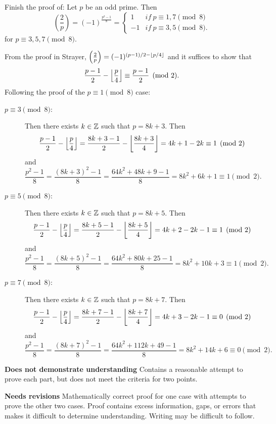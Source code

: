 \documentclass[letterpaper, 11pt]{ximera}
\begin{document}
\begin{ex}
 	Finish the proof of:  Let $p$ be an odd prime. Then 
	\begin{equation*}
 		\left(\frac{2}{p}\right)=(-1)^{\frac{p^2-1}{8}}=
		\begin{cases}
			 1& if\ p\equiv 1,7 \pmod 8\\
			 -1 & if\ p\equiv 3,5 \pmod 8.
		\end{cases}
	\end{equation*} 
	for $p\equiv 3,5,7 \pmod 8$.

	\begin{solution}
		From the proof in Strayer, $\left(\frac{2}{p}\right)=(-1)^{(p-1)/2-\left\lfloor p/4\right\rfloor}$ and it suffices to show that 
			\[\frac{p-1}{2}-\left\lfloor \frac{p}{4}\right\rfloor\equiv \frac{p-1}{2}\pmod{2}.\]
		Following the proof of the $p\equiv 1\pmod{8}$ case:

		\begin{description}
			\item[$p\equiv3\pmod 8$:] Then there exists $k\in\mathbb Z$ such that $p=8k+3.$ Then 
			\[\frac{p-1}{2}-\left\lfloor \frac{p}{4}\right\rfloor
			=\frac{8k+3-1}{2}-\left\lfloor \frac{8k+3}{4}\right\rfloor
			=4k+1-2k\equiv 1\pmod{2}\]
			and 
			\[\frac{p^2-1}{8}
			=\frac{(8k+3)^2-1}{8}
			=\frac{64k^2+48k+9-1}{8}
			=8k^2+6k+1\equiv 1\pmod{2}.\]
			\item[$p\equiv5\pmod 8$:] Then there exists $k\in\mathbb Z$ such that $p=8k+5.$ Then 
			\[\frac{p-1}{2}-\left\lfloor \frac{p}{4}\right\rfloor
			=\frac{8k+5-1}{2}-\left\lfloor \frac{8k+5}{4}\right\rfloor
			=4k+2-2k-1\equiv 1\pmod{2}\]
			and 
			\[\frac{p^2-1}{8}
			=\frac{(8k+5)^2-1}{8}
			=\frac{64k^2+80k+25-1}{8}
			=8k^2+10k+3\equiv 1\pmod{2}.\]
			\item[$p\equiv7\pmod 8$:] Then there exists $k\in\mathbb Z$ such that $p=8k+7.$ Then 
			\[\frac{p-1}{2}-\left\lfloor \frac{p}{4}\right\rfloor
			=\frac{8k+7-1}{2}-\left\lfloor \frac{8k+7}{4}\right\rfloor
			=4k+3-2k-1\equiv 0\pmod{2}\]
			and 
			\[\frac{p^2-1}{8}
			=\frac{(8k+7)^2-1}{8}
			=\frac{64k^2+112k+49-1}{8}
			=8k^2+14k+6\equiv 0\pmod{2}.\]
		\end{description}
	\end{solution}

\begin{writeRubric}
    \item \textbf{Does not demonstrate understanding}
     Contains a reasonable attempt to prove each part, but does not meet the criteria for two points.
    \item \textbf{Needs revisions} Mathematically correct proof for one case with attempts to prove the other two cases. Proof contains excess information, gaps, or errors that makes it difficult to determine understanding. Writing may be difficult to follow. 
     

\end{writeRubric}
\end{ex}
\end{document}
